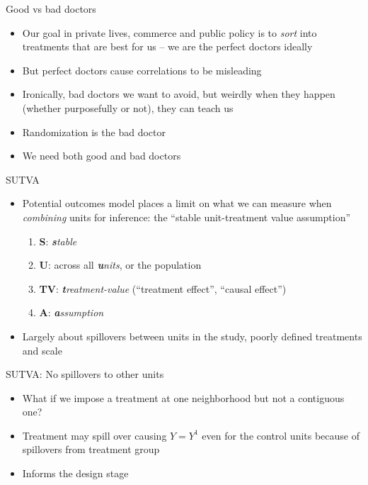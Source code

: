 \documentclass{beamer}
\begin{document}
\begin{frame}{Good vs bad doctors}

\begin{itemize}
\item Our goal in private lives, commerce and public policy is to \emph{sort} into treatments that are best for us -- we are the perfect doctors ideally
\item But perfect doctors cause correlations to be misleading
\item Ironically, bad doctors we want to avoid, but weirdly when they happen (whether purposefully or not), they can teach us
\item Randomization is the bad doctor
\item We need both good and bad doctors
\end{itemize}

\end{frame}




\begin{frame}{SUTVA}

  \begin{itemize}
    \item Potential outcomes model places a limit on what we can measure when \emph{combining} units for inference: the ``stable unit-treatment value assumption''
          \begin{enumerate}
            \item \textbf{S}: \emph{\textbf{s}table}
            \item \textbf{U}: across all \emph{\textbf{u}nits}, or the population
            \item \textbf{TV}: \emph{\textbf{t}reatment-value} (``treatment effect'', ``causal effect'')
            \item \textbf{A}: \emph{\textbf{a}ssumption}
          \end{enumerate}
    \item Largely about spillovers between units in the study, poorly defined treatments and scale
  \end{itemize}
\end{frame}


\begin{frame}{SUTVA: No spillovers to other units}

  \begin{itemize}
    \item What if we impose a treatment at one neighborhood but not a contiguous one?
    \item Treatment may spill over causing $Y=Y^1$ even for the control units because of spillovers from treatment group
    \item Informs the design stage
  \end{itemize}
\end{frame}
\end{document}
